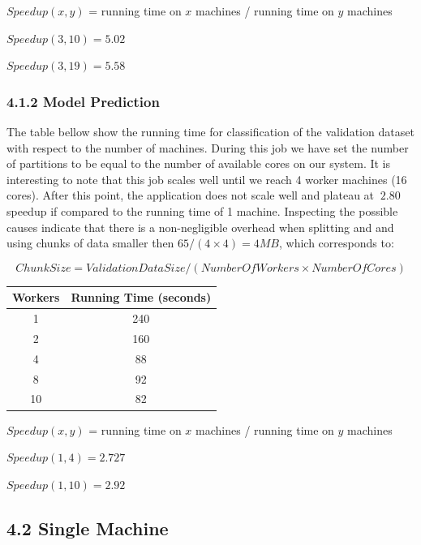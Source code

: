 \documentclass{neu_handout}
\begin{document}
\begin{center}
$Speed up(x,y)$ = running time on $x$ machines / running time on $y$ machines

$Speed up(3,10) = 5.02$

$Speed up(3,19) = 5.58$
\end{center}

\subsubsection*{4.1.2 Model Prediction}

The table bellow show the running time for classification of the validation dataset with respect to the number of machines. During this job we have set the number of partitions to be equal to the number of available cores on our system. It is interesting to note that this job scales well until we reach 4 worker machines (16 cores). After this point, the application does not scale well and plateau at $~2.80$ speedup if compared to the running time of 1 machine. Inspecting the possible causes indicate that there is a non-negligible overhead when splitting and and using chunks of data smaller then $65/(4\times 4)=4MB$, which corresponds to:

$$ChunkSize = ValidationDataSize/(Number Of Workers \times Number Of Cores)$$

\begin{center}
 \begin{tabular}{||c c ||} 
 \hline
Workers & Running Time (seconds) \\ [0.5ex] 
 \hline\hline
 1 & 240  \\ 
 \hline
 2 & 160  \\ 
 \hline
 4 & 88  \\ 
 \hline
 8 & 92  \\ 
 \hline
 10 & 82  \\  [1ex] 
 \hline
\end{tabular}
\end{center}

\begin{center}
$Speed up(x,y)$ = running time on $x$ machines / running time on $y$ machines

$Speed up(1,4) = 2.727$

$Speed up(1,10) = 2.92$
\end{center}


\subsection*{4.2 Single Machine}
\end{document}
